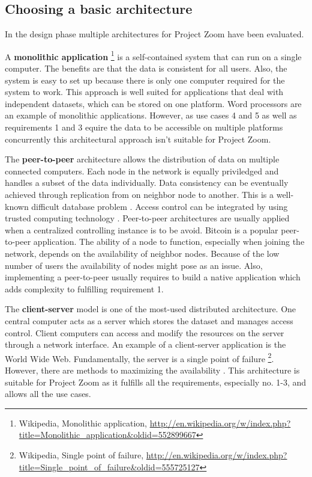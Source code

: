 \subsection{Choosing a basic architecture}
In the design phase multiple architectures for Project Zoom have been evaluated. 

A \textbf{monolithic application} \footnote{Wikipedia, Monolithic application, \url{http://en.wikipedia.org/w/index.php?title=Monolithic_application&oldid=552899667}} is a self-contained system that can run on a single computer. The benefits are that the data is consistent for all users.  Also, the system is easy to set up because there is only one computer required for the system to work. This approach is well suited for applications that deal with independent datasets, which can be stored on one platform. Word processors are an example of monolithic applications. However, as use cases 4 and 5 as well as requirements 1 and 3 equire the data to be accessible on multiple platforms concurrently this architectural approach isn't suitable for Project Zoom.

The \textbf{peer-to-peer} \cite{Schollmeier_2001} architecture allows the distribution of data on multiple connected computers. Each node in the network is equally priviledged and handles a subset of the data individually. Data consistency can be eventually achieved through replication from on neighbor node to another. This is a well-known difficult database problem \cite{Gray_1996}. Access control can be integrated by using trusted computing technology \cite{Sandhu_2005}. Peer-to-peer architectures are usually applied when a centralized controlling instance is to be avoid. Bitcoin is a popular peer-to-peer application. The ability of a node to function, especially when joining the network, depends on the availability of neighbor nodes. Because of the low number of users the availability of nodes might pose as an issue. Also, implementing a peer-to-peer usually requires to build a native application which adds complexity to fulfilling requirement 1.

The \textbf{client-server} \cite{Berson_1996} model is one of the most-used distributed architecture. One central computer acts as a server which stores the dataset and manages access control. Client computers can access and modify the resources on the server through a network interface. An example of a client-server application is the World Wide Web. Fundamentally, the server is a single point of failure \footnote{Wikipedia, Single point of failure, \url{http://en.wikipedia.org/w/index.php?title=Single_point_of_failure&oldid=555725127}}. However, there are methods to maximizing the availability \cite{Gray_1991} \cite{Colyer_2000}. This architecture is suitable for Project Zoom as it fulfills all the requirements, especially no. 1-3, and allows all the use cases.

